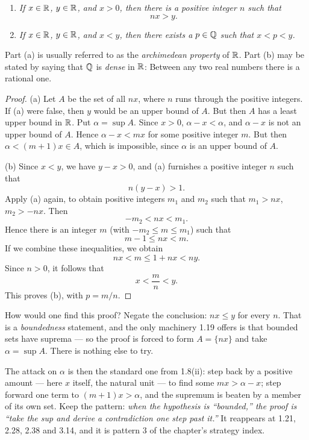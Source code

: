 \begin{enumerate}[label=(\alph*), leftmargin=2.2em, itemsep=3pt, topsep=3pt]
  \item \emph{If $x \in \mathbb{R}$, $y \in \mathbb{R}$, and $x > 0$, then there is a positive
        integer $n$ such that}
        \[ nx > y. \]
  \item \emph{If $x \in \mathbb{R}$, $y \in \mathbb{R}$, and $x < y$, then there exists a
        $p \in \mathbb{Q}$ such that $x < p < y$.}
\end{enumerate}
Part (a) is usually referred to as the \emph{archimedean property} of $\mathbb{R}$. Part
(b) may be stated by saying that $\mathbb{Q}$ is \emph{dense} in $\mathbb{R}$: Between any two
real numbers there is a rational one.

\begin{proof}
(a) Let $A$ be the set of all $nx$, where $n$ runs through the positive
integers. If (a) were false, then $y$ would be an upper bound of $A$. But then
$A$ has a least upper bound in $\mathbb{R}$. Put $\alpha = \sup A$. Since $x > 0$,
$\alpha - x < \alpha$, and $\alpha - x$ is not an upper bound of $A$. Hence
$\alpha - x < mx$ for some positive integer $m$. But then
$\alpha < (m+1)x \in A$, which is impossible, since $\alpha$ is an upper bound
of $A$.

(b) Since $x < y$, we have $y - x > 0$, and (a) furnishes a positive integer $n$
such that
\[ n(y-x) > 1. \]
Apply (a) again, to obtain positive integers $m_1$ and $m_2$ such that
$m_1 > nx$, $m_2 > -nx$. Then
\[ -m_2 < nx < m_1. \]
Hence there is an integer $m$ (with $-m_2 \le m \le m_1$) such that
\[ m - 1 \le nx < m. \]
If we combine these inequalities, we obtain
\[ nx < m \le 1 + nx < ny. \]
Since $n > 0$, it follows that
\[ x < \frac{m}{n} < y. \]
This proves (b), with $p = m/n$.
\end{proof}

\begin{unpack}
How would one find this proof? Negate the conclusion: $nx \le y$ for every
$n$. That is a \emph{boundedness} statement, and the only machinery 1.19
offers is that bounded sets have suprema --- so the proof is forced to form
$A = \{nx\}$ and take $\alpha = \sup A$. There is nothing else to try.

The attack on $\alpha$ is then the standard one from 1.8(ii): step back by a
positive amount --- here $x$ itself, the natural unit --- to find some
$mx > \alpha - x$; step forward one term to $(m+1)x > \alpha$, and the
supremum is beaten by a member of its own set. Keep the pattern: \emph{when
the hypothesis is ``bounded,'' the proof is ``take the sup and derive a
contradiction one step past it.''} It reappears at 1.21, 2.28, 2.38 and 3.14,
and it is pattern 3 of the chapter's strategy index.
\end{unpack}

